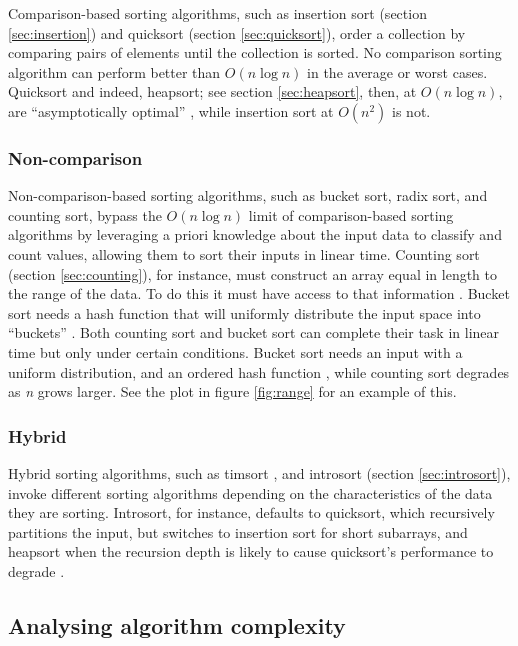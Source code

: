 \documentclass[12pt, a4paper]{article}
\begin{document}
Comparison-based sorting algorithms, such as insertion sort (section \ref{sec:insertion}) and quicksort (section \ref{sec:quicksort}), order a collection by comparing pairs of elements until the collection is sorted. No comparison sorting algorithm can perform better than $O(n\log n)$ in the average or worst cases. Quicksort and indeed, heapsort; see section \ref{sec:heapsort}, then, at $O(n\log n)$, are ``asymptotically optimal'' \autocite[165-168]{cormen01}, while insertion sort at $O(n^{2})$ is not.

\subsubsection{Non-comparison}

Non-comparison-based sorting algorithms, such as bucket sort, radix sort, and counting sort, bypass the $O(n\log n)$ limit of comparison-based sorting algorithms by leveraging a priori knowledge about the input data to classify and count values, allowing them to sort their inputs in linear time. Counting sort (section \ref{sec:counting}), for instance, must construct an array equal in length to the range of the data. To do this it must have access to that information \autocite[168]{cormen01}. Bucket sort needs a hash function that will uniformly distribute the input space into ``buckets'' \autocite[74]{heineman2016algorithms}. Both counting sort and bucket sort can complete their task in linear time but only under certain conditions. Bucket sort needs an input with a uniform distribution, and an ordered hash function \autocite[75]{heineman2016algorithms}, while counting sort degrades as \emph{n} grows larger. See the plot in figure \ref{fig:range} for an example of this.

\subsubsection{Hybrid}

Hybrid sorting algorithms, such as timsort \autocite{peters:timsort}, and introsort (section \ref{sec:introsort}), invoke different sorting algorithms depending on the characteristics of the data they are sorting. Introsort, for instance, defaults to quicksort, which recursively partitions the input, but switches to insertion sort for short subarrays, and heapsort when the recursion depth is likely to cause quicksort's performance to degrade \autocite{musser1997}.

\subsection{Analysing algorithm complexity}\label{sec:analysingcomplexity}
\end{document}

